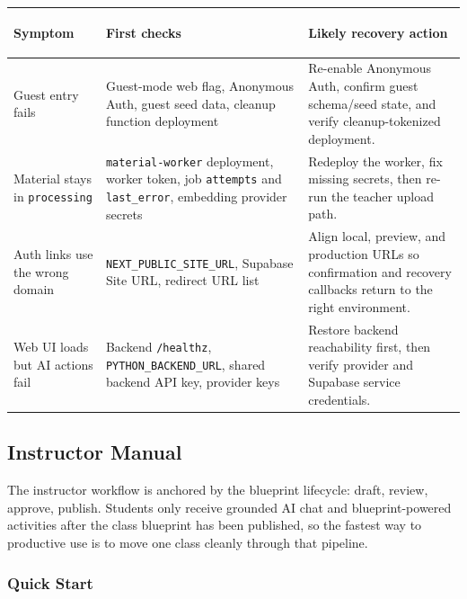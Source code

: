 \documentclass[11pt,a4paper]{article}
\begin{document}
\begin{table}[H]
\centering
\small
\begin{tabularx}{\textwidth}{>{\bfseries\raggedright\arraybackslash}p{3.2cm}>{\raggedright\arraybackslash}p{4.7cm}X}
\toprule
Symptom & First checks & Likely recovery action \\
\midrule
Guest entry fails & Guest-mode web flag, Anonymous Auth, guest seed data, cleanup function deployment & Re-enable Anonymous Auth, confirm guest schema/seed state, and verify cleanup-tokenized deployment. \\
Material stays in \texttt{processing} & \texttt{material-worker} deployment, worker token, job \texttt{attempts} and \texttt{last\_error}, embedding provider secrets & Redeploy the worker, fix missing secrets, then re-run the teacher upload path. \\
Auth links use the wrong domain & \texttt{NEXT\_PUBLIC\_SITE\_URL}, Supabase Site URL, redirect URL list & Align local, preview, and production URLs so confirmation and recovery callbacks return to the right environment. \\
Web UI loads but AI actions fail & Backend \texttt{/healthz}, \texttt{PYTHON\_BACKEND\_URL}, shared backend API key, provider keys & Restore backend reachability first, then verify provider and Supabase service credentials. \\
\bottomrule
\end{tabularx}
\end{table}

\subsection{Instructor Manual}

\noindent The instructor workflow is anchored by the blueprint lifecycle: draft, review, approve,
publish. Students only receive grounded AI chat and blueprint-powered activities after the class
blueprint has been published, so the fastest way to productive use is to move one class cleanly
through that pipeline.

\subsubsection*{Quick Start}
\end{document}
